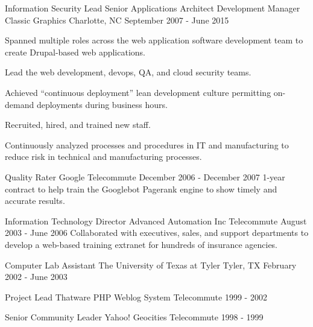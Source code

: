 \begin{cventries}

\cventry
{Information Security Lead \newline {\vspace{-.75mm}}
Senior Applications Architect \newline {\vspace{-.75mm}}
Development Manager}
{Classic Graphics} %
{Charlotte, NC} %
{September 2007 - June 2015} %
{
Spanned multiple roles across the web application software development team to create Drupal-based web applications.
\begin{cvitems}
\item[]
\item {Lead the web development, devops, QA, and cloud security teams.}
\item {Achieved “continuous deployment” lean development culture permitting on-demand deployments during business hours.}
\item {Recruited, hired, and trained new staff.}
\item {Continuously analyzed processes and procedures in IT and manufacturing to reduce risk in technical and manufacturing processes.}
\end{cvitems}
}


\cventry
{Quality Rater}
{Google}
{Telecommute}
{December 2006 - December 2007} %
{ %
1-year contract to help train the Googlebot Pagerank engine to show timely and accurate results.
}


\cventry
{Information Technology Director}
{Advanced Automation Inc}
{Telecommute}
{August 2003 - June 2006} %
{ %
Collaborated with executives, sales, and support departments to develop a web-based training extranet for hundreds of insurance agencies.
}


\cventry
{Computer Lab Assistant}
{The University of Texas at Tyler}
{Tyler, TX}
{February 2002 - June 2003} %
{ %
}


\cventry
{Project Lead}
{Thatware PHP Weblog System}
{Telecommute}
{1999 - 2002} %
{ %
}


\cventry
{Senior Community Leader}
{Yahoo! Geocities}
{Telecommute}
{1998 - 1999} %
{ %
}


\end{cventries}
